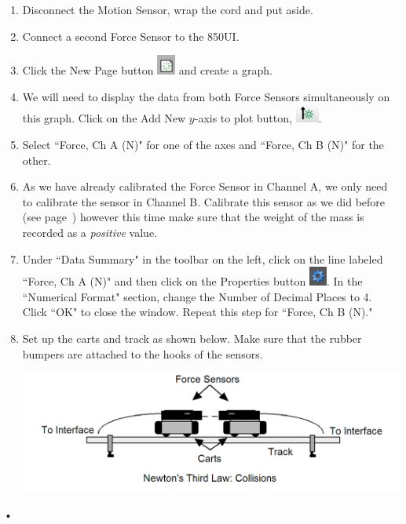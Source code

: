 \documentclass[main.tex]{subfiles}
\begin{document}
\begin{enumerate}
\item
Disconnect the Motion Sensor, wrap the cord and put aside.
\item
Connect a second Force Sensor to the 850UI.
\item
Click the New Page button \includegraphics{Add_Page} and create a graph.
\item
We will need to display the data from both Force Sensors simultaneously on this graph. Click on the Add New $y$-axis to plot button, \includegraphics{Add_New_Y-Axis}.
\item
Select ``Force, Ch A (N)" for one of the axes and ``Force, Ch B (N)" for the other.
\item
As we have already calibrated the Force Sensor in Channel A, we only need to calibrate the sensor in Channel B. Calibrate this sensor as we did before (see page~\pageref{page:Calibration}) however this time make sure that the weight of the mass is recorded as a \emph{positive} value.
\item
Under ``Data Summary" in the toolbar on the left, click on the line labeled ``Force, Ch A (N)" and then click on the Properties button \includegraphics{Properties}. In the ``Numerical Format" section, change the Number of Decimal Places to 4. Click ``OK" to close the window. Repeat this step for ``Force, Ch B (N)."
\item
Set up the carts and track as shown below. Make sure that the rubber bumpers are attached to the hooks of the sensors.

\includegraphics[width=\textwidth]{Imp-Mom_2_Setup}
\end{enumerate}•
\end{document}
